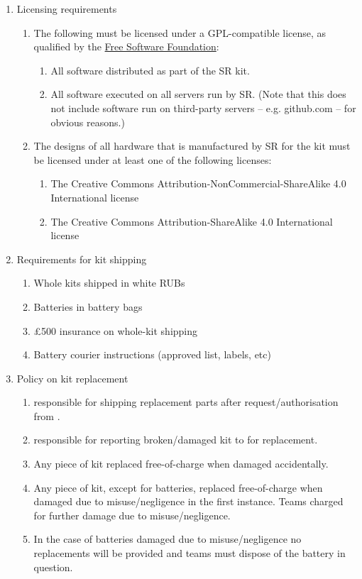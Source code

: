 \begin{enumerate}
\item Licensing requirements
  \begin{enumerate}

  \item The following must be licensed under a GPL-compatible license, as qualified by the \href{http://www.gnu.org/licenses/license-list.en.html#GPLCompatibleLicenses}{Free Software Foundation}:
    \begin{enumerate}
    \item All software distributed as part of the SR kit.
    \item All software executed on all servers run by SR. (Note that this does not include software run on third-party servers -- e.g. github.com -- for obvious reasons.)
    \end{enumerate}

  \item The designs of all hardware that is manufactured by SR for the kit must be licensed under at least one of the following licenses:
    \begin{enumerate}
    \item The Creative Commons Attribution-NonCommercial-ShareAlike 4.0 International license
    \item The Creative Commons Attribution-ShareAlike 4.0 International license
    \end{enumerate}
  \end{enumerate}


\item Requirements for kit shipping
  \begin{enumerate}
    \item{Whole kits shipped in white RUBs}
    \item{Batteries in battery bags}
    \item{\pounds500 insurance on whole-kit shipping}
    \item{Battery courier instructions (approved list, labels, etc)}
  \end{enumerate}
\item Policy on kit replacement
  \begin{enumerate}
    \item{ responsible for shipping replacement parts after request/authorisation from .}
    \item{ responsible for reporting broken/damaged kit to  for replacement.}
    \item{Any piece of kit replaced free-of-charge when damaged accidentally.}
    \item{Any piece of kit, except for batteries, replaced free-of-charge when damaged due to misuse/negligence in the first instance. Teams charged for further damage due to misuse/negligence.}
    \item{In the case of batteries damaged due to misuse/negligence no replacements will be provided and teams must dispose of the battery in question.}
  \end{enumerate}


\end{enumerate}

